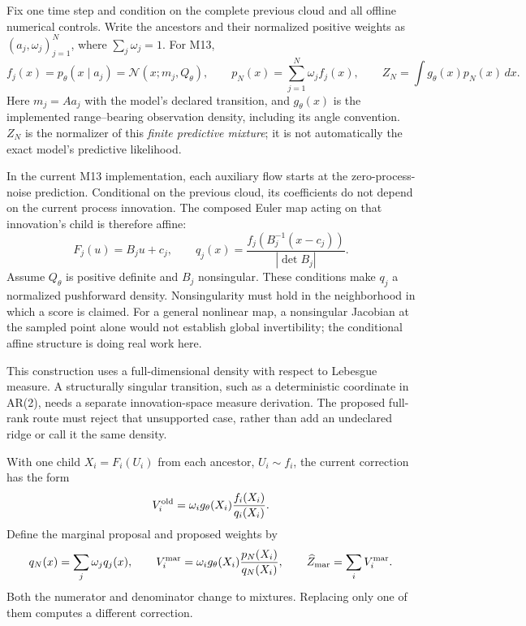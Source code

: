 \documentclass[11pt]{article}
\newcommand{\N}{\mathcal N}
\begin{document}
Fix one time step and condition on the complete previous cloud and all
offline numerical controls. Write the ancestors and their normalized
positive weights as $(a_j,\omega_j)_{j=1}^N$, where
$\sum_j\omega_j=1$. For M13,
\begin{equation}
 f_j(x)=p_\theta(x\mid a_j)=\N(x;m_j,Q_\theta),\qquad
 p_N(x)=\sum_{j=1}^N\omega_j f_j(x),\qquad
 Z_N=\int g_\theta(x)p_N(x)\,dx .
 \label{eq:predictive-mixture}
\end{equation}
Here $m_j=Aa_j$ with the model's declared transition, and $g_\theta(x)$ is
the implemented range--bearing observation density, including its angle
convention. $Z_N$ is the normalizer of this \emph{finite predictive
mixture}; it is not automatically the exact model's predictive likelihood.

In the current M13 implementation, each auxiliary flow starts at the
zero-process-noise prediction. Conditional on the previous cloud, its
coefficients do not depend on the current process innovation. The composed
Euler map acting on that innovation's child is therefore affine:
\begin{equation}
 F_j(u)=B_j u+c_j,\qquad
 q_j(x)=\frac{f_j\!\left(B_j^{-1}(x-c_j)\right)}
                   {|\det B_j|}.
 \label{eq:affine-density}
\end{equation}
Assume $Q_\theta$ is positive definite and $B_j$ nonsingular.
These conditions make $q_j$ a normalized pushforward density.
Nonsingularity must hold in the neighborhood in which a score is claimed.
For a general nonlinear map, a nonsingular Jacobian at the sampled point
alone would not establish global invertibility; the conditional affine
structure is doing real work here.

This construction uses a full-dimensional density with respect to Lebesgue
measure. A structurally singular transition, such as a deterministic
coordinate in AR(2), needs a separate innovation-space measure derivation.
The proposed full-rank route must reject that unsupported case, rather
than add an undeclared ridge or call it the same density.

With one child $X_i=F_i(U_i)$ from each ancestor, $U_i\sim f_i$, the current
correction has the form
\begin{equation}
 V_i^{\rm old}=\omega_i g_\theta(X_i)
                         \frac{f_i(X_i)}{q_i(X_i)} .
 \label{eq:old-weight}
\end{equation}
Define the marginal proposal and proposed weights by
\begin{equation}
 q_N(x)=\sum_j\omega_j q_j(x),\qquad
 V_i^{\rm mar}=\omega_i g_\theta(X_i)
                       \frac{p_N(X_i)}{q_N(X_i)},\qquad
 \widehat Z_{\rm mar}=\sum_i V_i^{\rm mar}.
 \label{eq:marginal-weight}
\end{equation}
Both the numerator and denominator change to mixtures. Replacing only one
of them computes a different correction.
\end{document}
